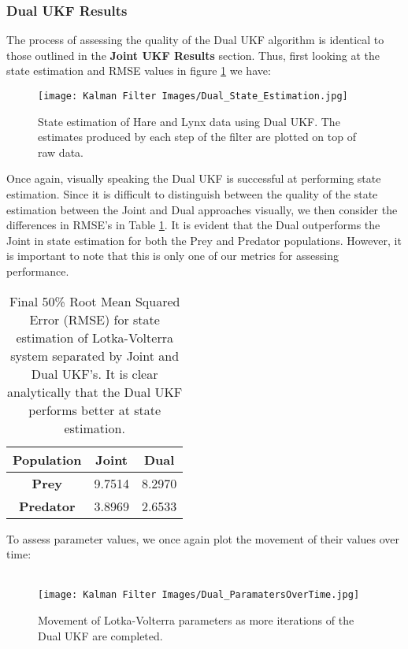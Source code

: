 \documentclass{article}
\begin{document}
                                

\subsubsection{Dual UKF Results}
The process of assessing the quality of the Dual UKF algorithm is identical to those outlined in the \textbf{Joint UKF Results} section. Thus, first looking at the state estimation and RMSE values in figure \ref{fig:LV_Dual_StateEstimation} we have:

\begin{figure}[H]
    \centering
    \texttt{[image: Kalman Filter Images/Dual\_State\_Estimation.jpg]}
    \caption{State estimation of Hare and Lynx data using Dual UKF. The estimates produced by each step of the filter are plotted on top of raw data.}
    \label{fig:LV_Dual_StateEstimation}
\end{figure}



Once again, visually speaking the Dual UKF is successful at performing state estimation. Since it is difficult to distinguish between the quality of the state estimation between the Joint and Dual approaches visually, we then consider the differences in RMSE's in Table \ref{table:LV_StateEstimation_RMSE}. It is evident that the Dual outperforms the Joint in state estimation for both the Prey and Predator populations. However, it is important to note that this is only one of our metrics for assessing performance.

\begin{table}[H]
  \begin{center}
    \label{tab:table1}
    \begin{tabular}{c|c|c} %
      \textbf{Population} & \textbf{Joint} & \textbf{Dual} \\
      \hline
      \textbf{Prey} & 9.7514 & 8.2970\\
      \textbf{Predator} & 3.8969 & 2.6533
    \end{tabular}
    \caption{Final 50\% Root Mean Squared Error (RMSE) for state estimation of Lotka-Volterra system separated by Joint and Dual UKF's. It is clear analytically that the Dual UKF performs better at state estimation.}
    \label{table:LV_StateEstimation_RMSE}
  \end{center}
\end{table}

To assess parameter values, we once again plot the movement of their values over time:\\
\\
\begin{figure}[H]
    \centering
    \texttt{[image: Kalman Filter Images/Dual\_ParamatersOverTime.jpg]}
    \caption{Movement of Lotka-Volterra parameters as more iterations of the Dual UKF are completed.}
    \label{fig:LV_Dual_ParamMovement}
\end{figure}
\end{document}

